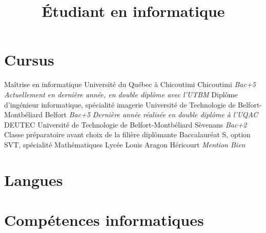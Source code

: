 \documentclass[10pt,a4paper,sans]{moderncv}
\title{Étudiant en informatique}
\begin{document}
	\maketitle


	\section{Cursus}
			{Maîtrise en informatique}
			{Université du Québec à Chicoutimi}
			{Chicoutimi}
			{\textit{Bac+5}}
			{\textit{Actuellement en dernière année, en double diplôme avec l'UTBM}}
			{Diplôme d'ingénieur informatique, spécialité imagerie}
			{Université de Technologie de Belfort-Montbéliard}
			{Belfort}
			{\textit{Bac+5}}
			{\textit{Dernière année réalisée en double diplôme à l'UQAC}}
			{DEUTEC}
			{Université de Technologie de Belfort-Montbéliard}
			{Sèvenans}
			{\textit{Bac+2}}
			{Classe préparatoire avant choix de la filière diplômante}
			{Baccalauréat S, option SVT, spécialité Mathématiques}
			{Lycée Louis Aragon}
			{Héricourt}
			{\small\textit{Mention Bien}}
			{}


	\vspace*{\deletedSpace}
	\section{Langues}


	\vspace*{\deletedSpace}
	\section{Compétences informatiques}
\end{document}
